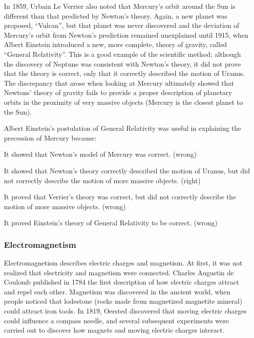 In 1859, Urbain Le Verrier also noted that Mercury's orbit around the Sun is different than that predicted by Newton's theory. Again, a new planet was proposed, ``Vulcan'', but that planet was never discovered and the deviation of Mercury's orbit from Newton's prediction remained unexplained until 1915, when Albert Einstein introduced a new, more complete, theory of gravity, called ``General Relativity''. This is a good example of the scientific method; although the discovery of Neptune was consistent with Newton's theory, it did not prove that the theory is correct, only that it correctly described the motion of Uranus. The discrepancy that arose when looking at Mercury ultimately showed that Newtons' theory of gravity fails to provide a proper description of planetary orbits in the proximity of very massive objects (Mercury is the closest planet to the Sun). 

\begin{checkpointMC}{Albert Einstein's postulation of General Relativity was useful in explaining the precession of Mercury because:}
\item It showed that Newton's model of Mercury was correct. (wrong)
\item It showed that Newton's theory correctly described the motion of Uranus, but did not correctly describe the motion of more massive objects. (right)
\item It proved that Verrier's theory was correct, but did not correctly describe the motion of more massive objects. (wrong)
\item It proved Einstein's theory of General Relativity to be correct. (wrong)
\end{checkpointMC}
 

\subsubsection{Electromagnetism}
Electromagnetism describes electric charges and magnetism. At first, it was not realized that electricity and magnetism were connected. Charles Augustin de Coulomb published in 1784 the first description of how electric charges attract and repel each other. Magnetism was discovered in the ancient world, when people noticed that lodestone (rocks made from magnetized magnetite mineral) could attract iron tools. In 1819, Oersted discovered that moving electric charges could influence a compass needle, and several subsequent experiments were carried out to discover how magnets and moving electric charges interact.

